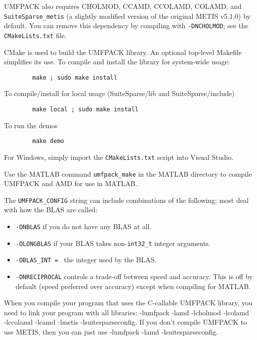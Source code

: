 \documentclass[11pt]{article}
\begin{document}
UMFPACK also requires CHOLMOD, CCAMD, CCOLAMD, COLAMD, and
\verb'SuiteSparse_metis' (a slightly modified version of the original
METIS v5.1.0) by default.  You can remove this dependency by compiling with
\verb'-DNCHOLMOD'; see the \verb'CMakeLists.txt' file.

CMake is used to build the UMFPACK library.  An optional top-level Makefile
simplifies its use.  To compile and install the library for system-wide usage:

\begin{verbatim}
        make ; sudo make install
\end{verbatim}

    To compile/install for local usage (SuiteSparse/lib and SuiteSparse/include)

\begin{verbatim}
        make local ; sudo make install
\end{verbatim}

    To run the demos

\begin{verbatim}
        make demo
\end{verbatim}

For Windows, simply import the \verb'CMakeLists.txt' script into Visual Studio.

Use the MATLAB command {\tt umfpack\_make} in the MATLAB directory
to compile UMFPACK and AMD for use in MATLAB.

The {\tt UMFPACK\_CONFIG} string can include combinations of the following;
most deal with how the BLAS are called:
\begin{itemize}
\item {\tt -DNBLAS} if you do not have any BLAS at all.
\item {\tt -DLONGBLAS} if your BLAS takes non-\verb'int32_t' integer arguments.
\item {\tt -DBLAS\_INT = } the integer used by the BLAS.

\item {\tt -DNRECIPROCAL} controls a trade-off between speed and accuracy.
    This is off by default (speed preferred over accuracy) except when
    compiling for MATLAB.
\end{itemize}

When you compile your program that uses the C-callable UMFPACK library,
you need to link your program with all libraries:
-lumfpack -lamd -lcholmod -lcolamd -lccolamd -lcamd -lmetis -lsuitesparseconfig.
If you don't compile UMFPACK to use METIS, then you can  just use
-lumfpack -lamd -lsuitesparseconfig.
\end{document}
